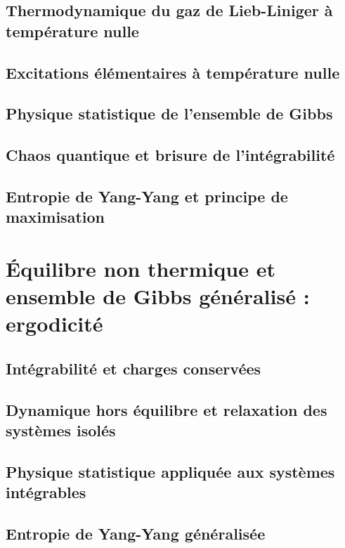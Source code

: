 \section{Thermodynamique du gaz de Lieb-Liniger à température nulle}
\section{Excitations élémentaires à température nulle}

\section{Physique statistique de l’ensemble de Gibbs}



\section{Chaos quantique et brisure de l’intégrabilité}
\section{Entropie de Yang-Yang et principe de maximisation}

\chapter{Équilibre non thermique et ensemble de Gibbs généralisé : ergodicité}
\minitoc
\section{Intégrabilité et charges conservées}
\section{Dynamique hors équilibre et relaxation des systèmes isolés}
\section{Physique statistique appliquée aux systèmes intégrables}

\section{Entropie de Yang-Yang généralisée}

